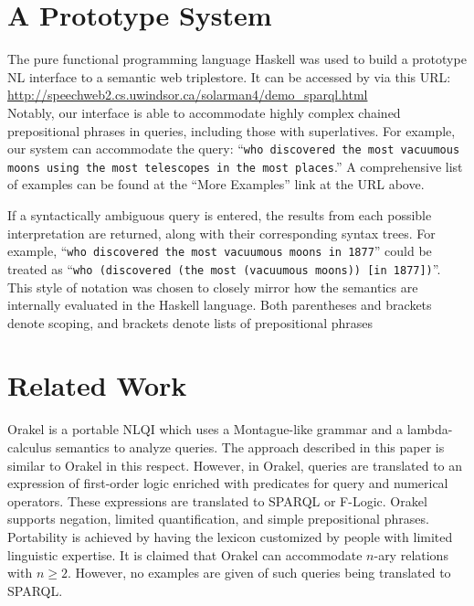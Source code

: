 \documentclass[../main.tex]{subfiles}
\begin{document}
\begin{refsection}
\section{A Prototype System}
\label{icsc2020conf:prot}

The pure functional programming language Haskell was used to build a prototype NL interface to a
semantic web triplestore.  It can be accessed by via this URL: \\

{\small \url{http://speechweb2.cs.uwindsor.ca/solarman4/demo_sparql.html}} \\

\noindent Notably, our interface is able to accommodate highly complex chained prepositional phrases in queries, including those with superlatives.
For example, our system can accommodate the query: ``\texttt{who discovered the most vacuumous moons using the most telescopes in the most places}.''  A comprehensive list of examples can be found at the ``More Examples'' link at the URL above.

If a syntactically ambiguous query is entered, the results from each possible interpretation are returned, along with their corresponding syntax trees.
For example, ``\texttt{who discovered the most vacuumous moons in 1877}'' could be treated as ``\texttt{who (discovered (the most (vacuumous moons)) [in 1877])}''.  This style of notation was chosen to closely mirror how the semantics are internally evaluated in the Haskell language.  Both parentheses and brackets denote scoping, and brackets denote lists of prepositional phrases

\section{Related Work}
\label{icsc2020conf:relatedwork}
Orakel \cite{cimiano:haase} is a portable NLQI which uses a Montague-like grammar and a lambda-calculus semantics to analyze queries. The approach described in this paper is similar to Orakel in this respect. However, in Orakel, queries are translated to an expression of first-order logic enriched with predicates for query and numerical operators. These expressions are translated to SPARQL or F-Logic. Orakel supports negation, limited quantification, and simple prepositional phrases. Portability is achieved by having the lexicon customized by people with limited linguistic expertise. It is claimed that Orakel can accommodate $n$-ary relations with $n \geq 2$. However, no examples are given of such queries being translated to SPARQL.


\end{refsection}
\end{document}
